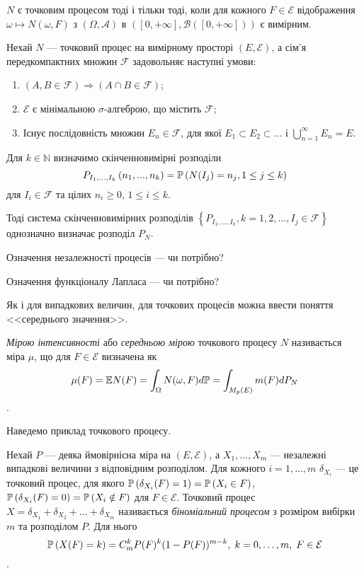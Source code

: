 \begin{theorem}
    $N$ є точковим процесом тоді і тільки тоді, коли для кожного
    $F \in \mathcal{E}$
    відображення $\omega \mapsto N(\omega, F)$
    з $\left(\Omega, \mathcal{A}\right)$
    в $\left([0, +\infty], \mathcal{B}([0, +\infty])\right)$
    є вимірним.
\end{theorem}
\begin{theorem}
    Нехай $N$ --- точковий процес на вимірному просторі
    $\left(E, \mathcal{E}\right)$, а сім'я передкомпактних множин $\mathcal{F}$
    задовольняє наступні умови:
    \begin{enumerate}
        \item $\left(A, B \in \mathcal{F}\right) \Rightarrow \left(A \cap B \in \mathcal{F}\right)$;
        \item $\mathcal{E}$ є мінімальною $\sigma$-алгеброю, що містить $\mathcal{F}$;
        \item Існує послідовність множин $E_n \in \mathcal{F}$, для якої
        $E_1 \subset E_2 \subset ...$ і $\bigcup_{n=1}^{\infty} E_n = E$.
    \end{enumerate}
    Для $k \in \mathbb{N}$ визначимо скінченновимірні розподіли
    $$
        P_{I_1,...,I_k} \left(n_1, ..., n_k\right) = 
        \P{N(I_j) = n_j, 1\leq j \leq k}
    $$
    для $I_i \in \mathcal{F}$ та цілих $n_i \geq 0$, $1 \leq i \leq k$.
    
    Тоді система скінченновимірних розподілів
    $\left\{P_{I_1,...,I_k}, k = 1,2,..., I_j \in \mathcal{F} \right\}$
    однозначно визначає розподіл $P_N$.
\end{theorem}

{\color{red}Означення незалежності процесів --- чи потрібно?}

{\color{red}Означення функціоналу Лапласа --- чи потрібно?}

Як і для випадкових величин, для
точкових процесів можна ввести поняття <<середнього значення>>.
\begin{definition}
    \emph{Мірою інтенсивності} або \emph{середньою мірою} точкового процесу $N$
    називається міра $\mu$, що для $F \in \mathcal{E}$ визначена як
    $$
        \mu(F) = \E N(F) = \int_{\Omega} N(\omega, F) d\mathbb{P} = 
        \int_{M_p(E)} m(F) d P_N
    $$.
\end{definition}

Наведемо приклад точкового процесу.
\begin{definition}
    Нехай $P$ --- деяка ймовірнісна міра на $\left(E, \mathcal{E}\right)$, а
    $X_1, \dots, X_m$ --- незалежні випадкові величини з відповідним розподілом.
    Для кожного $i = 1, \dots, m$ $\delta_{X_i}$ --- це точковий процес,
    для якого $\P{\delta_{X_i}(F) = 1} = \P{X_i \in F}$,
    $\P{\delta_{X_i}(F) = 0} = \P{X_i \notin F}$ для $F \in \mathcal{E}$.
    Точковий процес $X = \delta_{X_1} + \delta_{X_2} + \dots + \delta_{X_m}$
    називається \emph{біноміальний процесом}
    з розміром вибірки $m$ та розподілом $P$. Для нього
    $$
        \P{X(F) = k} = C_m^k P(F)^k (1 - P(F))^{m-k}, \; k = 0,\dots,m, \; F \in \mathcal{E}
    $$.
\end{definition}

